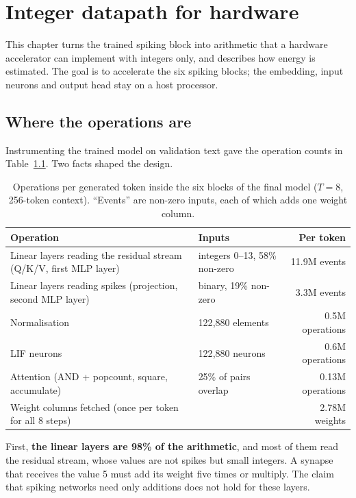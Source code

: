\chapter{Integer datapath for hardware}
\label{ch:hardware}

This chapter turns the trained spiking block into arithmetic that a hardware accelerator can implement with
integers only, and describes how energy is estimated. The goal is to accelerate the six spiking blocks; the
embedding, input neurons and output head stay on a host processor.

\section{Where the operations are}

Instrumenting the trained model on validation text gave the operation counts in Table~\ref{tab:ops}. Two facts
shaped the design.

\begin{table}[t]
\centering
\caption[Operations per token inside the spiking blocks]{Operations per generated token inside the six blocks of
the final model ($T=8$, 256-token context). ``Events'' are non-zero inputs, each of which adds one weight column.}
\label{tab:ops}
\small
\begin{tabular}{llr}
\toprule
Operation & Inputs & Per token \\
\midrule
Linear layers reading the residual stream (Q/K/V, first MLP layer) & integers 0--13, 58\% non-zero & 11.9M events \\
Linear layers reading spikes (projection, second MLP layer) & binary, 19\% non-zero & 3.3M events \\
Normalisation & 122{,}880 elements & 0.5M operations \\
LIF neurons & 122{,}880 neurons & 0.6M operations \\
Attention (AND + popcount, square, accumulate) & 25\% of pairs overlap & 0.13M operations \\
\midrule
Weight columns fetched (once per token for all 8 steps) & & 2.78M weights \\
\bottomrule
\end{tabular}
\end{table}

First, \textbf{the linear layers are 98\% of the arithmetic}, and most of them read the residual stream, whose
values are not spikes but small integers. A synapse that receives the value 5 must add its weight five times or
multiply. The claim that spiking networks need only additions does not hold for these layers.

